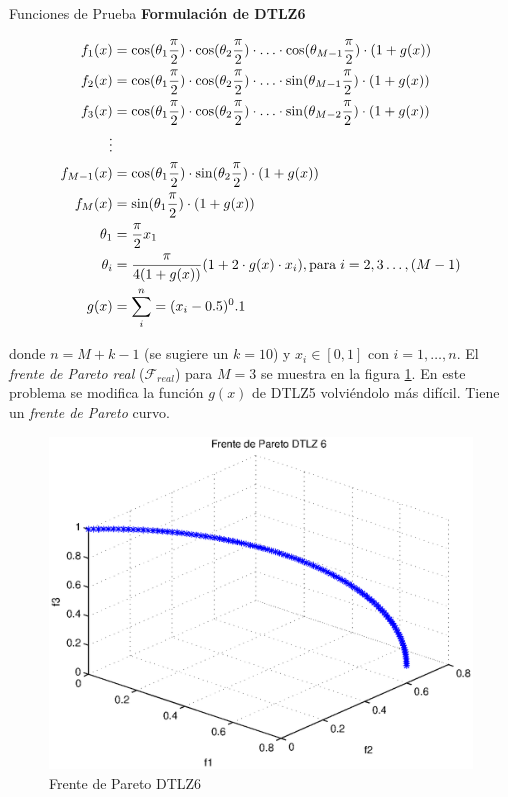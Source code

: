 \begin{chapter}{Funciones de Prueba}
\textbf{Formulaci\'on de DTLZ6}

\begin{align*}
f_1(x)&=\cos(\theta_1\frac{\pi}{2})\cdot\cos(\theta_2\frac{\pi}{2})\cdot\ldots\cdot \cos(\theta_{M-1}\frac{\pi}{2})\cdot(1+g(x))\\
f_2(x)&=\cos(\theta_1\frac{\pi}{2})\cdot\cos(\theta_2\frac{\pi}{2})\cdot\ldots\cdot \sin(\theta_{M-1}\frac{\pi}{2})\cdot(1+g(x))\\
f_3(x)&=\cos(\theta_1\frac{\pi}{2})\cdot\cos(\theta_2\frac{\pi}{2})\cdot\ldots\cdot \sin(\theta_{M-2}\frac{\pi}{2})\cdot(1+g(x))\\
\vdots&\\
f_{M-1}(x)&=\cos(\theta_1\frac{\pi}{2})\cdot\sin(\theta_2\frac{\pi}{2})\cdot(1+g(x))\\
f_{M}(x)&=\sin(\theta_1\frac{\pi}{2})\cdot(1+g(x))\\
\theta_1&=\frac{\pi}{2}x_1\\
\theta_i&=\frac{\pi}{4(1+g(x))}(1+2\cdot g(x)\cdot x_i),  \text{para}\hspace{1mm} i=2,3\dots,(M-1)\\
g(x)&=\sum^n_i=(x_i-0.5)^0.1
\end{align*}

donde $n=M+k-1$ (se sugiere un $k=10$) y $x_i\in[0,1]$ con $i=1,\ldots,n$.  El \textit{frente de Pareto real} ($\mathcal{F}_{real}$) para 
$M=3$ se muestra en la figura \ref{fig:DTLZ6}. En este problema se modifica la funci\'on $g(x)$ de DTLZ5 volvi\'endolo m\'as dif\'icil. 
Tiene un {\it frente de Pareto} curvo.

\begin{figure}[h!]
 \centering
\includegraphics[scale=0.4]{ApendiceA/paretoDTLZ6.eps}
\caption{Frente de Pareto DTLZ6}
\label{fig:DTLZ6}
\end{figure}


\end{chapter}
